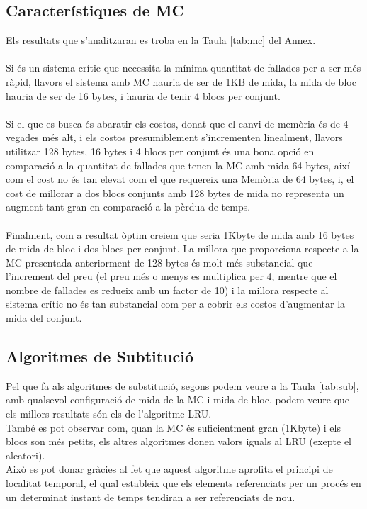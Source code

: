 \documentclass{article}
\begin{document}
\subsection{Característiques de MC}
Els resultats que s'analitzaran es troba en la Taula \ref{tab:mc} del Annex.\\
\\
Si és un sistema crític que necessita la mínima quantitat de fallades per a ser més
ràpid, llavors el sistema amb MC hauria de ser de 1KB
de mida, la mida de bloc hauria de ser de 16 bytes, i hauria de tenir 4 blocs per conjunt.\\
\\
Si el que es busca és abaratir els costos, donat que el canvi de memòria és de 4 vegades més
alt, i els costos presumiblement s'incrementen linealment, llavors utilitzar 128 bytes, 16 bytes i
4 blocs per conjunt és una bona opció en comparació a la quantitat de fallades que tenen la MC amb
mida 64 bytes, així com el cost no és tan elevat com el que requereix una Memòria de 64 bytes,
i, el cost de millorar a dos blocs conjunts amb 128 bytes de mida no representa un augment tant gran
en comparació a la pèrdua de temps.\\
\\
Finalment, com a resultat òptim creiem que seria 1Kbyte de mida amb 16 bytes de mida de bloc i
dos blocs per conjunt. La millora que proporciona respecte a la MC presentada anteriorment de 128 bytes
és molt més substancial que l'increment del preu (el preu més o menys es multiplica per 4, mentre que
el nombre de fallades es redueix amb un factor de 10) i la millora respecte al sistema crític no
és tan substancial com per a cobrir els costos d'augmentar la mida del conjunt.
\subsection{Algoritmes de Subtitució}
Pel que fa als algoritmes de substitució, segons podem veure a la Taula \ref{tab:sub}, amb qualsevol
 configuració de mida de la MC i mida de bloc, podem veure que els millors resultats són els de l'algoritme LRU.\\
També es pot observar com, quan la MC és suficientment gran (1Kbyte) i els blocs son més petits, els altres 
algoritmes donen valors iguals al LRU (exepte el aleatori).\\
 Això es pot donar gràcies al fet que aquest algoritme aprofita el principi de localitat temporal, el qual estableix 
que els elements referenciats per un procés en un determinat instant de temps tendiran a ser referenciats de nou.\\
\end{document}
